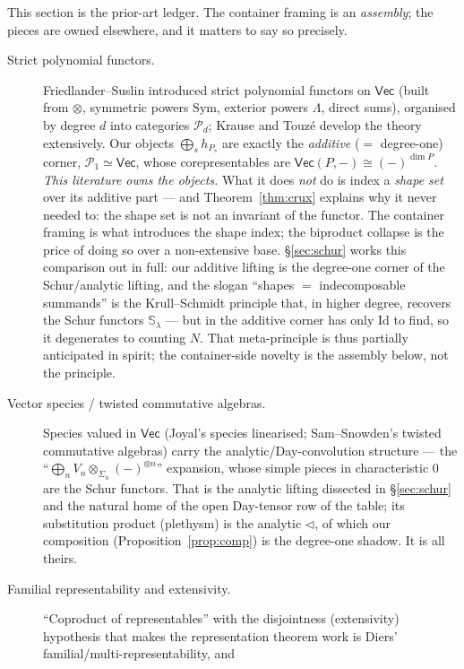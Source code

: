 \documentclass[11pt]{amsart}
\theoremstyle{plain}
\theoremstyle{definition}
\renewcommand{\Vec}{\mathsf{Vec}}
\newcommand{\Id}{\mathrm{Id}}
\newcommand{\bul}{{-}}
\newcommand{\iso}{\cong}
\begin{document}
This section is the prior-art ledger. The container framing is an
\emph{assembly}; the pieces are owned elsewhere, and it matters to say so
precisely.

\begin{description}
\item[Strict polynomial functors.] Friedlander--Suslin introduced strict
  polynomial functors on $\Vec$ (built from $\otimes$, symmetric powers
  $\mathrm{Sym}$, exterior powers $\Lambda$, direct sums), organised by degree
  $d$ into categories $\mathcal P_d$; Krause and Touz\'e develop the theory
  extensively. Our objects $\bigoplus_s h_{P_s}$ are exactly the \emph{additive}
  ($=$ degree-one) corner, $\mathcal P_1\simeq\Vec$, whose corepresentables are
  $\Vec(P,\bul)\iso(\bul)^{\dim P}$. \emph{This literature owns the objects.}
  What it does \emph{not} do is index a \emph{shape set} over its additive part
  --- and Theorem~\ref{thm:crux} explains why it never needed to: the shape set
  is not an invariant of the functor. The container framing is what introduces
  the shape index; the biproduct collapse is the price of doing so over a
  non-extensive base. \S\ref{sec:schur} works this comparison out in full: our
  additive lifting is the degree-one corner of the Schur/analytic lifting, and
  the slogan ``shapes $=$ indecomposable summands'' is the Krull--Schmidt
  principle that, in higher degree, recovers the Schur functors
  $\mathbb S_\lambda$ --- but in the additive corner has only $\Id$ to find, so
  it degenerates to counting $N$. That meta-principle is thus partially
  anticipated in spirit; the container-side novelty is the assembly below, not
  the principle.
\item[Vector species / twisted commutative algebras.] Species valued in $\Vec$
  (Joyal's species linearised; Sam--Snowden's twisted commutative algebras)
  carry the analytic/Day-convolution structure --- the ``$\bigoplus_n V_n
  \otimes_{\Sigma_n}(\bul)^{\otimes n}$'' expansion, whose simple pieces in
  characteristic $0$ are the Schur functors. That is the analytic lifting
  dissected in \S\ref{sec:schur} and the natural home of the open Day-tensor row
  of the table; its substitution product (plethysm) is the analytic $\lhd$, of
  which our composition (Proposition~\ref{prop:comp}) is the degree-one shadow.
  It is all theirs.
\item[Familial representability and extensivity.] ``Coproduct of
  representables'' with the disjointness (extensivity) hypothesis that makes the
  representation theorem work is Diers' familial/multi-representability, and

\end{description}
\end{document}
